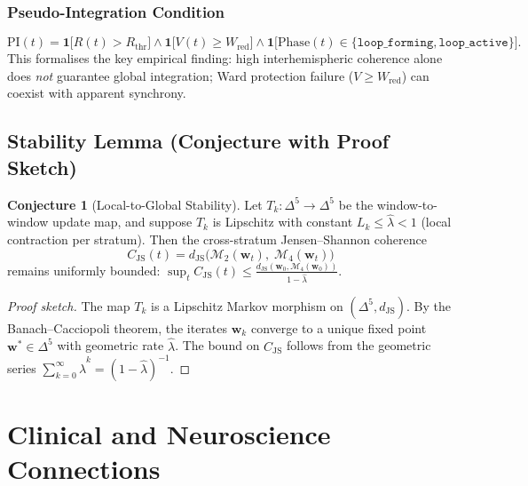 \documentclass[12pt,a4paper]{article}
\theoremstyle{plain}
\theoremstyle{definition}
\newtheorem{conjecture}[theorem]{Conjecture}
\newcommand{\hatlambda}{\hat{\lambda}}
\newcommand{\dJS}{d_{\mathrm{JS}}}
\begin{document}
\subsubsection{Pseudo-Integration Condition}
\begin{equation}
  \mathrm{PI}(t) =
  \mathbf{1}\!\bigl[R(t) > R_{\mathrm{thr}}\bigr] \wedge
  \mathbf{1}\!\bigl[V(t) \geq W_{\mathrm{red}}\bigr] \wedge
  \mathbf{1}\!\bigl[\mathrm{Phase}(t) \in \{\texttt{loop\_forming},\texttt{loop\_active}\}\bigr].
  \label{eq:pi}
\end{equation}
This formalises the key empirical finding: high interhemispheric coherence alone does
\emph{not} guarantee global integration; Ward protection failure ($V \geq W_{\mathrm{red}}$)
can coexist with apparent synchrony.

\subsection{Stability Lemma (Conjecture with Proof Sketch)}
\label{sec:math:lemma}

\begin{conjecture}[Local-to-Global Stability]
\label{conj:stability}
Let $T_k : \Delta^5 \to \Delta^5$ be the window-to-window update map, and suppose
$T_k$ is Lipschitz with constant $L_k \leq \hatlambda < 1$ (local contraction per
stratum).  Then the cross-stratum Jensen--Shannon coherence
\begin{equation}
  C_{\mathrm{JS}}(t) = \dJS\!\bigl(\mathcal{M}_2(\mathbf{w}_t),\; \mathcal{M}_4(\mathbf{w}_t)\bigr)
  \label{eq:cjs}
\end{equation}
remains uniformly bounded:
$\sup_t C_{\mathrm{JS}}(t) \leq \frac{\dJS(\mathbf{w}_0, \mathcal{M}_4(\mathbf{w}_0))}{1 - \hatlambda}$.
\end{conjecture}

\begin{proof}[Proof sketch]
The map $T_k$ is a Lipschitz Markov morphism on $(\Delta^5, \dJS)$.  By the
Banach--Cacciopoli theorem, the iterates $\mathbf{w}_k$ converge to a unique fixed point
$\mathbf{w}^* \in \Delta^5$ with geometric rate $\hatlambda$.  The bound on $C_{\mathrm{JS}}$
follows from the geometric series $\sum_{k=0}^\infty \hatlambda^k = (1-\hatlambda)^{-1}$.
\end{proof}

\section{Clinical and Neuroscience Connections}
\label{sec:clinical}
\end{document}
